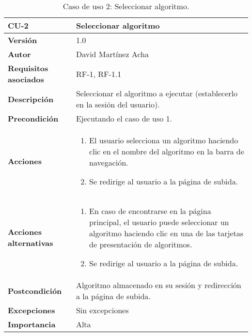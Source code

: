 \begin{table}[p]
	\centering
	\begin{tabularx}{\linewidth}{ p{} p{} }
		\toprule
		\textbf{CU-2}    & \textbf{Seleccionar algoritmo}\\
		\toprule
		\textbf{Versión}              & 1.0    \\
		\textbf{Autor}                & David Martínez Acha \\
		\textbf{Requisitos asociados} & RF-1, RF-1.1 \\
		\textbf{Descripción}          & Seleccionar el algoritmo a ejecutar (establecerlo en la sesión del usuario). \\
		\textbf{Precondición}         & Ejecutando el caso de uso 1. \\
		\textbf{Acciones}             &
		\begin{enumerate}
			\def\labelenumi{\arabic{enumi}.}
			\tightlist
			\item El usuario selecciona un algoritmo haciendo clic en el nombre del algoritmo en la barra de navegación.
			\item Se redirige al usuario a la página de subida.
		\end{enumerate}\\
        \textbf{Acciones alternativas}&
		\begin{enumerate}
			\def\labelenumi{\arabic{enumi}.}
			\tightlist
			\item En caso de encontrarse en la página principal, el usuario
		puede seleccionar un algoritmo haciendo clic en una de las tarjetas de
		presentación de algoritmos.
			\item Se redirige al usuario a la página de subida. \end{enumerate}\\
		\textbf{Postcondición}        & Algoritmo almacenado en su sesión y redirección a la página de subida. \\
		\textbf{Excepciones}          & Sin excepciones \\
		\textbf{Importancia}          & Alta \\
		\bottomrule
	\end{tabularx}
	\caption{Caso de uso 2: Seleccionar algoritmo.}
\end{table}

